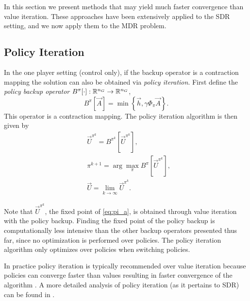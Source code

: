 In this section we present methods that may yield much faster convergence than value iteration. These approaches have been extensively applied to the SDR setting, and we now apply them to the MDR problem. 

\subsection{Policy Iteration}

In the one player setting (control only), if the backup operator is a contraction mapping the solution can also be obtained via \emph{policy iteration}. First define the \emph{policy backup operator} $B^{\pi}[\cdot]: \mathbb{R}^{n_G} \rightarrow \mathbb{R}^{n_G}$, 
%
\begin{equation} \label{eq:backup_policy}
B^{\pi}[\vec{A}] = \min\left\{ \vec{h}, \gamma \Phi_{\pi} \vec{A} \right \} .
\end{equation}%
\noindent This operator is a contraction mapping. The policy iteration algorithm is then given by
%
\begin{subequations}\label{eq:pi}
\begin{align}
&\vec{U}^{\pi^k} = B^{\pi^k}[\vec{U}^{\pi^k}] \label{eq:pi_a} ,\\
&\pi^{k+1} = \arg\underset{\pi}{\max}B^{\pi}[\vec{U}^{\pi^k}] ,\\ 
&\vec{U} = \lim_{k\rightarrow \infty} \vec{U}^{\pi^k}.
\end{align}
\end{subequations}

Note that ${\vec{U}^{\pi^k}}$, the fixed point of \eqref{eq:pi_a}, is obtained through value iteration with the policy backup. Finding the fixed point of the policy backup is computationally less intensive than the other backup operators presented thus far, since no optimization is performed over policies. The policy iteration algorithm only optimizes over policies when switching policies.  

In practice policy iteration is typically recommended over value iteration because policies can converge faster than values resulting in faster convergence of the algorithm \cite{Russell2003}. A more detailed analysis of policy iteration (as it pertains to SDR) can be found in \cite{Bokanowski2009,Howard1964, Puterman1979}. 

